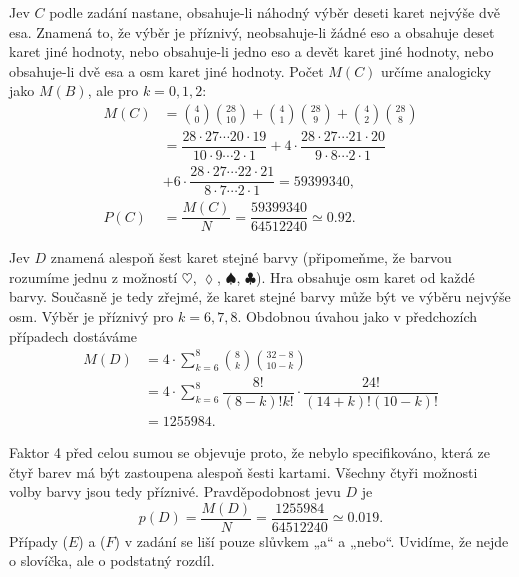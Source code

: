 \begin{mdframed}[style=mdexam]
\begin{example}
      Jev \(C\) podle zadání nastane, obsahuje-li náhodný výběr deseti karet nejvýše dvě esa.
      Znamená to, že výběr je příznivý, neobsahuje-li žádné eso a obsahuje deset karet jiné hodnoty,
      nebo obsahuje-li jedno eso a devět karet jiné hodnoty, nebo obsahuje-li dvě esa a osm karet
      jiné hodnoty. Počet \(M(C)\) určíme analogicky jako \(M(B)\), ale pro \(k= 0, 1, 2\):
      \begin{align*}
        M(C) &= \binom{4}{0}\binom{28}{10} + \binom{4}{1}\binom{28}{9} +\binom{4}{2}\binom{28}{8} \\
             &=        \dfrac{28\cdot27\cdots20\cdot19}{10\cdot9\cdots2\cdot1}
                +4\cdot\dfrac{28\cdot27\cdots21\cdot20}{ 9\cdot8\cdots2\cdot1}                    \\
             &  +6\cdot\dfrac{28\cdot27\cdots22\cdot21}{ 8\cdot7\cdots2\cdot1} = \num{59399340},  \\
        P(C) &= \dfrac{M(C)}{N} = \dfrac{\num{59399340}}{\num{64512240}} \simeq\num{0.92}.
      \end{align*}
      
      Jev \(D\) znamená alespoň šest karet stejné barvy (připomeňme, že barvou rozumíme jednu z
      možností \(\heartsuit\), \(\lozenge\), \(\spadesuit\), \(\clubsuit\)). Hra obsahuje osm karet
      od každé barvy. Současně je tedy zřejmé, že karet stejné barvy může být ve výběru nejvýše osm.
      Výběr je příznivý pro \(k = 6, 7, 8\). Obdobnou úvahou jako v předchozích případech dostáváme
      \begin{align*}
        M(D) &= 4\cdot\sum^{8}_{k=6}\binom{8}{k}\binom{32 - 8}{10 - k}                    \\
             &= 4\cdot\sum^{8}_{k=6}\dfrac{8!}{(8-k)!k!}\cdot\dfrac{24!}{(14+k)!(10-k)!}  \\
             &= \num{1255984}.
      \end{align*}
      
      Faktor \num{4} před celou sumou se objevuje proto, že nebylo specifikováno, která ze čtyř
      barev má být zastoupena alespoň šesti kartami. Všechny čtyři možnosti volby barvy jsou tedy
      příznivé. Pravděpodobnost jevu \(D\) je
      \begin{equation*}
          p(D) = \dfrac{M(D)}{N} = \dfrac{\num{1255984}}{\num{64512240}} \simeq \num{0.019}.
      \end{equation*}
      Případy (\(E\)) a (\(F\)) v zadání se liší pouze slůvkem „a“ a „nebo“. Uvidíme, že nejde o
      slovíčka, ale o podstatný rozdíl. 
      

\end{example}
\end{mdframed}
